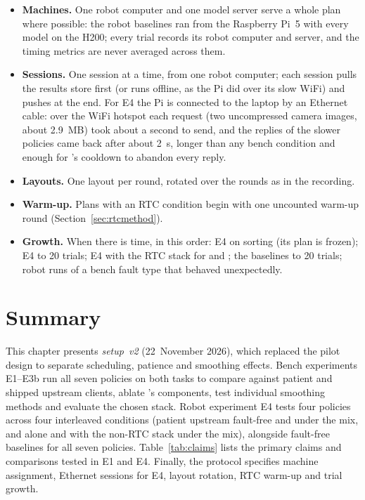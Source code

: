 \begin{itemize}
\item \textbf{Machines.} One robot computer and one model server serve a whole plan where possible: the robot
      baselines ran from the Raspberry Pi~5 with every model on the H200; every trial records its robot computer and
      server, and the timing metrics are never averaged across them.
\item \textbf{Sessions.} One session at a time, from one robot computer; each session pulls the results store first
      (or runs offline, as the Pi did over its slow WiFi) and pushes at the end. For E4 the Pi is connected to the
      laptop by an Ethernet cable: over the WiFi hotspot each request (two uncompressed camera images, about 2.9~MB)
      took about a second to send, and the replies of the slower policies came back after about 2~s, longer than any
      bench condition and enough for \drtc's cooldown to abandon every reply.
\item \textbf{Layouts.} One layout per round, rotated over the rounds as in the recording.
\item \textbf{Warm-up.} Plans with an RTC condition begin with one uncounted warm-up round (Section~\ref{sec:rtcmethod}).
\item \textbf{Growth.} When there is time, in this order: E4 on sorting (its plan is frozen); E4 to 20 trials; E4 with
      the RTC stack for \smolvla{} and \pizerofive; the baselines to 20 trials; robot runs of a bench fault type that behaved unexpectedly.
\end{itemize}

\section{Summary}
This chapter presents \emph{setup~v2} (22~November 2026), which replaced the pilot design to separate scheduling, patience and smoothing effects. Bench experiments E1--E3b run all seven policies on both tasks to compare \drtc{} against patient and shipped upstream clients, ablate \drtc's components, test individual smoothing methods and evaluate the chosen stack. Robot experiment E4 tests four policies across four interleaved conditions (patient upstream fault-free and under the mix, and \drtc{} alone and with the non-RTC stack under the mix), alongside fault-free baselines for all seven policies. Table~\ref{tab:claims} lists the primary claims and comparisons tested in E1 and E4. Finally, the protocol specifies machine assignment, Ethernet sessions for E4, layout rotation, RTC warm-up and trial growth.
